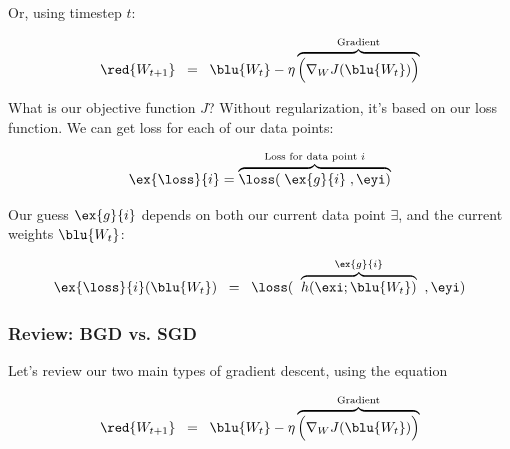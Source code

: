            Or, using timestep $t$:
            
            \begin{equation}
                \red{ W_{t+1} } 
                \;\;=\;\;
                \blu{ W_t }
                -
                \eta
                \overbrace{
                    \Big(
                        \nabla_W J ( \blu{ W_t } )
                    \Big)
                }^{\text{Gradient}}
            \end{equation}
            
            What is our objective function $J$? Without regularization, it's based on our loss function. We can get loss for each of our data points:
            
            \begin{equation}
                \ex{\loss}{i}
                =
                \overbrace{
                    \loss(
                    \; \ex{g}{i} \;
                    ,\eyi
                    )
                }^{\text{Loss for data point $i$}}
            \end{equation}
            
            Our guess $\ex{g}{i}$ depends on both our current data point $\exi$, and the current weights $\blu{ W_t }$:
            
            \begin{equation}
                \ex{\loss}{i}(\blu{ W_t })
                \;\;=\;\;
                \loss(
                \;\;
                \overbrace{
                     h(\exi;\blu{ W_t }) 
                }^{\ex{g}{i}}
                \;\;
                ,\eyi
                )
            \end{equation}
    
        \subsecdiv
    
        \subsubsection{Review: BGD vs. SGD}
        
            Let's review our two main types of gradient descent, using the equation
            
            \begin{equation}
                \red{ W_{t+1} } 
                \;\;=\;\;
                \blu{ W_t }
                -
                \eta
                \overbrace{
                    \Big(
                        \nabla_W J ( \blu{ W_t } )
                    \Big)
                }^{\text{Gradient}}
            \end{equation}
            
